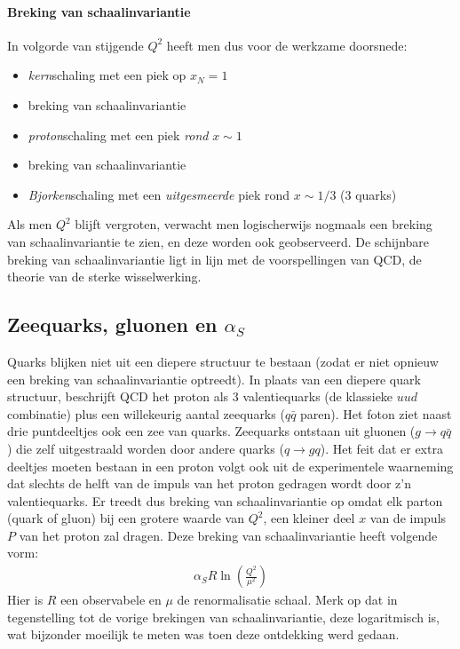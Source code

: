 \documentclass[a4paper,11pt]{article}
\numberwithin{equation}{section} %
\begin{document}
      \paragraph{Breking van schaalinvariantie}
In volgorde van stijgende $Q^2$ heeft men dus voor de werkzame doorsnede:
\begin{itemize}
  \item\textit{kern}schaling met een piek op $x_N=1$
  \item  breking van schaalinvariantie
  \item \textit{proton}schaling met een piek \textit{rond} $x \sim 1$
  \item breking van schaalinvariantie
  \item \textit{Bjorken}schaling met een \textit{uitgesmeerde} piek rond $x \sim 1/3$ (3 quarks)
\end{itemize}
Als men $Q^2$ blijft vergroten, verwacht men logischerwijs nogmaals een breking van schaalinvariantie te zien, en deze worden ook geobserveerd.
De schijnbare breking van schaalinvariantie ligt in lijn met de voorspellingen van QCD, de theorie van de sterke wisselwerking.

  \subsection{Zeequarks, gluonen en $\alpha_S$}
Quarks blijken niet uit een diepere structuur te bestaan (zodat er niet opnieuw een breking van schaalinvariantie optreedt).
In plaats van een diepere quark structuur, beschrijft QCD het proton als 3 valentiequarks (de klassieke $u u d$ combinatie) plus een willekeurig aantal zeequarks ($q\bar{q}$ paren).
Het foton ziet naast drie puntdeeltjes ook een zee van quarks.
Zeequarks ontstaan uit gluonen ($g\rightarrow q\bar{q}$) die zelf uitgestraald worden door andere quarks ($q\rightarrow gq$).
Het feit dat er extra deeltjes moeten bestaan in een proton volgt ook uit de experimentele waarneming dat slechts de helft van de impuls van het proton gedragen wordt door z’n valentiequarks.
Er treedt dus breking van schaalinvariantie op omdat elk parton (quark of gluon) bij een grotere waarde van $Q^2$, een kleiner deel  $x$ van de impuls $P$ van het proton zal dragen.
Deze breking van schaalinvariantie heeft volgende vorm:
\begin{align}
\alpha_S R \ln{\left( \frac{Q^2}{\mu^2}\right)}
\end{align}
Hier is $R$ een observabele en $\mu$ de renormalisatie schaal.
Merk op dat in tegenstelling tot de vorige brekingen van schaalinvariantie, deze logaritmisch is, wat bijzonder moeilijk te meten was toen deze ontdekking werd gedaan.
\end{document}
